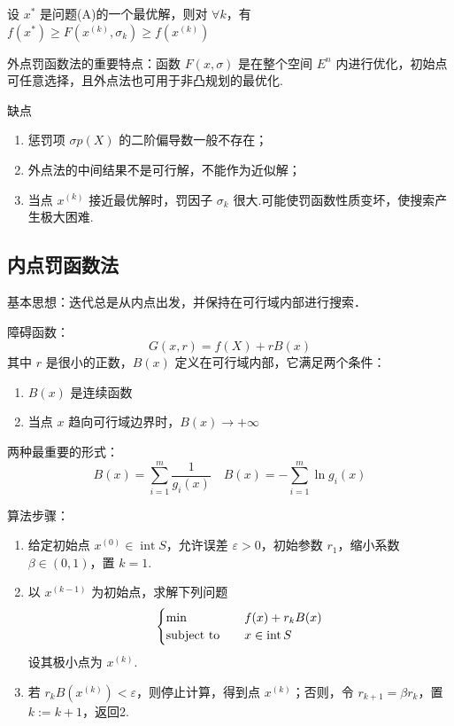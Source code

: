 \begin{theorem}
    设 $x^*$ 是问题(A)的一个最优解，则对 $\forall k$，有$f(x^*) \ge F(x^{(k)}, \sigma_k) \ge f(x^{(k)})$
\end{theorem}

\begin{remark}
    外点罚函数法的重要特点：函数 $F(x, \sigma)$ 是在整个空间 $E^n$ 内进行优化，初始点可任意选择，且外点法也可用于非凸规划的最优化.

    缺点\begin{enumerate}
        \item 惩罚项 $\sigma p(X)$ 的二阶偏导数一般不存在；
        \item 外点法的中间结果不是可行解，不能作为近似解；
        \item 当点 $x^{(k)}$ 接近最优解时，罚因子 $\sigma_k$ 很大.可能使罚函数性质变坏，使搜索产生极大困难.
    \end{enumerate}
\end{remark}

\subsection{内点罚函数法}
基本思想：迭代总是从内点出发，并保持在可行域内部进行搜索．

\begin{remark}
    障碍函数：\[G(x, r) = f(X) + rB(x)\]
    其中 $r$ 是很小的正数，$B(x)$ 定义在可行域内部，它满足两个条件：\begin{enumerate}
        \item $B(x)$ 是连续函数
        \item 当点 $x$ 趋向可行域边界时，$B(x) \to +\infty$
    \end{enumerate}
    两种最重要的形式：\[B(x) = \sum_{i = 1}^m \frac{1}{g_i(x)} \quad B(x) = -\sum_{i = 1}^m\ln g_i(x)\]
\end{remark}

\begin{remark}
    算法步骤：\begin{enumerate}
        \item 给定初始点 $x^{(0)} \in \operatorname{int} S$，允许误差 $\varepsilon > 0$，初始参数 $r_1$，缩小系数 $\beta\in (0, 1)$，置 $k=1$.
        \item 以 $x^{(k - 1)}$ 为初始点，求解下列问题\[\begin{cases}
            \min \quad &f(x) + r_kB(x)\\
            \operatorname{subject\ to} \quad &x \in \operatorname{int} S
        \end{cases}\]设其极小点为 $x^{(k)}$.
        \item 若 $r_kB(x^{(k)}) < \varepsilon$，则停止计算，得到点 $x^{(k)}$；否则，令 $r_{k + 1} = \beta r_k$，置 $k := k + 1$，返回2.
    \end{enumerate}
\end{remark}

